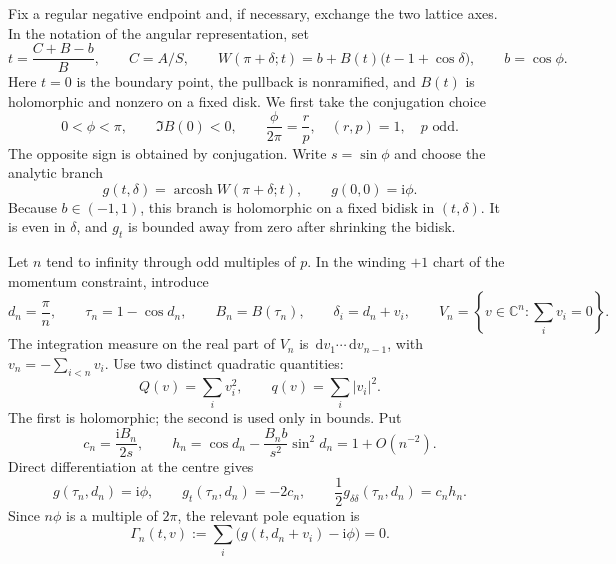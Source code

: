 \documentclass[11pt]{article}
\numberwithin{equation}{section}
\theoremstyle{definition}
\newcommand{\C}{\mathbb C}
\newcommand{\dd}{\,\mathrm d}
\newcommand{\ii}{\mathrm i}
\begin{document}
Fix a regular negative endpoint and, if necessary, exchange the two lattice
axes.  In the notation of the angular representation, set
\begin{equation}
 t=\frac{C+B-b}{B},\qquad C=A/S,\qquad
 W(\pi+\delta;t)=b+B(t)\bigl(t-1+\cos\delta\bigr),
 \qquad b=\cos\phi.
 \label{eq:morse-coordinate}
\end{equation}
Here $t=0$ is the boundary point, the pullback is nonramified, and $B(t)$
is holomorphic and nonzero on a fixed disk.  We first take the conjugation
choice
\begin{equation}
 0<\phi<\pi,\qquad \Im B(0)<0,\qquad
 \frac{\phi}{2\pi}=\frac rp,\quad (r,p)=1,\quad p\text{ odd}.
 \label{eq:morse-rational-phase}
\end{equation}
The opposite sign is obtained by conjugation.  Write $s=\sin\phi$ and choose
the analytic branch
\begin{equation}
 g(t,\delta)=\operatorname{arcosh}W(\pi+\delta;t),
 \qquad g(0,0)=\ii\phi.
 \label{eq:morse-g}
\end{equation}
Because $b\in(-1,1)$, this branch is holomorphic on a fixed bidisk in
$(t,\delta)$.  It is even in $\delta$, and $g_t$ is bounded away from zero
after shrinking the bidisk.

Let $n$ tend to infinity through odd multiples of $p$.  In the winding
$+1$ chart of the momentum constraint, introduce
\begin{equation}
 d_n=\frac\pi n,\qquad \tau_n=1-\cos d_n,\qquad
 B_n=B(\tau_n),\qquad
 \delta_i=d_n+v_i,\qquad
 V_n=\left\{v\in\C^n:\sum_i v_i=0\right\}.
 \label{eq:morse-centre}
\end{equation}
The integration measure on the real part of $V_n$ is
$\dd v_1\cdots\dd v_{n-1}$, with $v_n=-\sum_{i<n}v_i$.
Use two distinct quadratic quantities:
\begin{equation}
 Q(v)=\sum_i v_i^2,\qquad q(v)=\sum_i|v_i|^2.
 \label{eq:morse-two-quadratics}
\end{equation}
The first is holomorphic; the second is used only in bounds.
Put
\begin{equation}
 c_n=\frac{\ii B_n}{2s},\qquad
 h_n=\cos d_n-\frac{B_n b}{s^2}\sin^2d_n=1+O(n^{-2}).
 \label{eq:morse-h}
\end{equation}
Direct differentiation at the centre gives
\begin{equation}
 g(\tau_n,d_n)=\ii\phi,\qquad
 g_t(\tau_n,d_n)=-2c_n,\qquad
 \frac12g_{\delta\delta}(\tau_n,d_n)=c_nh_n.
 \label{eq:morse-centre-derivatives}
\end{equation}
Since $n\phi$ is a multiple of $2\pi$, the relevant pole equation is
\begin{equation}
 \Gamma_n(t,v):=\sum_i\bigl(g(t,d_n+v_i)-\ii\phi\bigr)=0.
 \label{eq:morse-pole-equation}
\end{equation}
\end{document}
